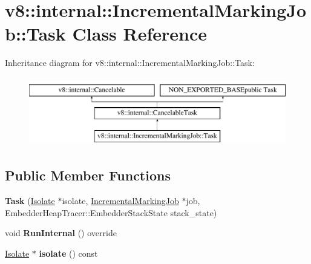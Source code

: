 \hypertarget{classv8_1_1internal_1_1IncrementalMarkingJob_1_1Task}{}\section{v8\+:\+:internal\+:\+:Incremental\+Marking\+Job\+:\+:Task Class Reference}
\label{classv8_1_1internal_1_1IncrementalMarkingJob_1_1Task}
Inheritance diagram for v8\+:\+:internal\+:\+:Incremental\+Marking\+Job\+:\+:Task\+:\begin{figure}[H]
\begin{center}
\leavevmode
\includegraphics[height=3.000000cm]{classv8_1_1internal_1_1IncrementalMarkingJob_1_1Task}
\end{center}
\end{figure}
\subsection*{Public Member Functions}
\begin{DoxyCompactItemize}
\item 
\mbox{\label{classv8_1_1internal_1_1IncrementalMarkingJob_1_1Task_a513f48cdc9326ca51a746e9a562943e9}} 
{\bfseries Task} (\mbox{\hyperlink{classv8_1_1internal_1_1Isolate}{Isolate}} $\ast$isolate, \mbox{\hyperlink{classv8_1_1internal_1_1IncrementalMarkingJob}{Incremental\+Marking\+Job}} $\ast$job, Embedder\+Heap\+Tracer\+::\+Embedder\+Stack\+State stack\+\_\+state)
\item 
\mbox{\label{classv8_1_1internal_1_1IncrementalMarkingJob_1_1Task_a568811a9687179b135e076a90d5eef67}} 
void {\bfseries Run\+Internal} () override
\item 
\mbox{\label{classv8_1_1internal_1_1IncrementalMarkingJob_1_1Task_a4c37691d1bfd7bcff705e6d9497dfc19}} 
\mbox{\hyperlink{classv8_1_1internal_1_1Isolate}{Isolate}} $\ast$ {\bfseries isolate} () const
\end{DoxyCompactItemize}
